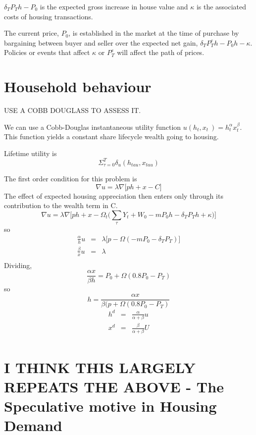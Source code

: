 $\delta_TP_Th-P_0$ is the expected gross increase in house value and $\kappa$ is the associated costs of housing transactions. 

The current price, $P_0$,  is established in the market at the time of purchase by bargaining between buyer and seller over the expected net gain, $\delta_TP^e_Th -P_0h-\kappa$. Policies or events that affect $\kappa$ or  $P^e_T$ will affect the path of prices.  

\section{Household behaviour}

USE A COBB DOUGLASS TO ASSESS IT.

We can use a Cobb-Douglas instantaneous utility function $ u(h_t,x_t\ )=h_t^{\alpha}  x_t^{\beta}$. This function yields a constant share lifecycle wealth going to housing. 

Lifetime utility is	\[\Sigma_{\tau=0}^T \delta_u(h_{tau},x_{tau}) \]


The first order condition for this problem is 
\[ \nabla u= \lambda \nabla \big[ ph+x - C \big] \]
The effect of expected housing appreciation then enters only through its contribution to the wealth term in C.
\[ \nabla u= \lambda \nabla \big[ ph+x -\Omega_t\big(\sum_{\tau}Y_t+W_0 -m P_0h-\delta_TP_Th + \kappa\big) \big] \]
so 
\begin{eqnarray*}
\frac{\alpha}{h} u&=& \lambda \big[p-\Omega(-mP_0-\delta_TP_T)\big]\\
 \frac{\beta}{x} u&=&\lambda\\
\end{eqnarray*}
Dividing,
\[\frac{\alpha x}{\beta h} =P_0+\Omega(0.8P_0-P_T)\]
so
\[h=\frac{\alpha x}{\beta (p+\Omega(0.8P_0-P_T)} \]
\begin{eqnarray*}
h^d &=&\frac{\alpha}{\alpha+\beta} u\\
x^d &=&\frac{\beta}{\alpha+\beta} U\\
\end{eqnarray*}




\section{I THINK THIS LARGELY REPEATS THE ABOVE - The Speculative motive in Housing Demand}

